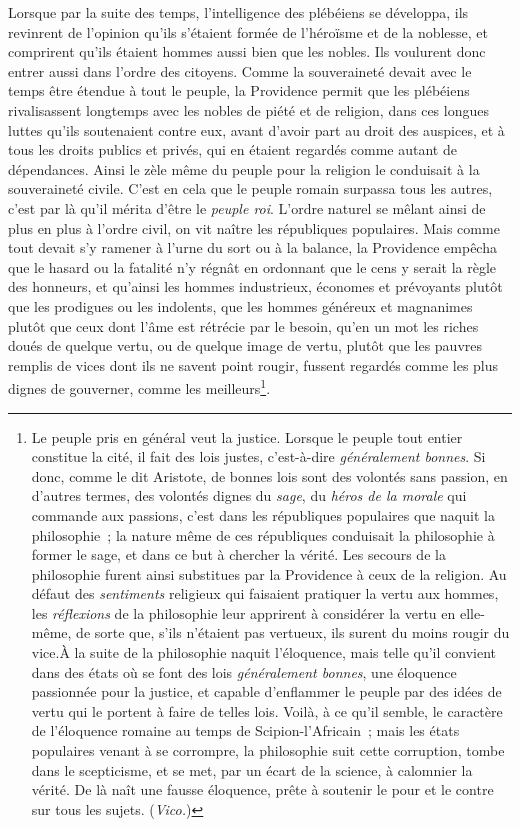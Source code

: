 \documentclass[french,twoside]{book} %
\begin{document}
Lorsque par la suite des temps, l’intelligence des plébéiens se développa, ils revinrent de l’opinion qu’ils s’étaient formée de l’héroïsme et de la noblesse, et comprirent qu’ils étaient hommes aussi bien que les nobles. Ils voulurent donc entrer aussi dans l’ordre des citoyens. Comme la souveraineté devait avec le temps être étendue à tout le peuple, la Providence permit que les plébéiens rivalisassent longtemps avec les nobles de piété et de  religion, dans ces longues luttes qu’ils soutenaient contre eux, avant d’avoir part au droit des auspices, et à tous les droits publics et privés, qui en étaient regardés comme autant de dépendances. Ainsi le zèle même du peuple pour la religion le conduisait à la souveraineté civile. C’est en cela que le peuple romain surpassa tous les autres, c’est par là qu’il mérita d’être le {\itshape peuple roi}. L’ordre naturel se mêlant ainsi de plus en plus à l’ordre civil, on vit naître les républiques populaires. Mais comme tout devait s’y ramener à l’urne du sort ou à la balance, la Providence empêcha que le hasard ou la fatalité n’y régnât en ordonnant que le cens y serait la règle des honneurs, et qu’ainsi les hommes industrieux, économes et prévoyants plutôt que les prodigues ou les indolents, que les hommes généreux et magnanimes plutôt que ceux dont l’âme est rétrécie par le besoin, qu’en un mot les riches doués de quelque vertu, ou de quelque image de vertu, plutôt que les pauvres remplis de vices dont ils ne savent point rougir, fussent regardés comme les plus dignes de gouverner, comme les meilleurs\footnote{Le peuple pris en général veut la justice. Lorsque le peuple tout entier constitue la cité, il fait des lois justes, c’est-à-dire {\itshape généralement bonnes}. Si donc, comme le dit Aristote, de bonnes lois sont des volontés sans passion, en d’autres termes, des volontés dignes du {\itshape sage}, du {\itshape héros de la morale} qui commande aux passions, c’est dans les républiques populaires que naquit la philosophie ; la nature même de ces républiques conduisait la philosophie à former le sage, et dans ce but à chercher la vérité. Les secours de la philosophie furent ainsi substitues par la Providence à ceux de la religion. Au défaut des {\itshape sentiments} religieux qui faisaient pratiquer la vertu aux hommes, les {\itshape réflexions} de la philosophie leur apprirent à considérer la vertu en elle-même, de sorte que, s’ils n’étaient pas vertueux, ils surent du moins rougir du vice.À la suite de la philosophie naquit l’éloquence, mais telle qu’il convient dans des états où se font des lois {\itshape généralement bonnes}, une éloquence passionnée pour la justice, et capable d’enflammer le peuple par des idées de vertu qui le portent à faire de telles lois. Voilà, à ce qu’il semble, le caractère de l’éloquence romaine au temps de Scipion-l’Africain ; mais les états populaires venant à se corrompre, la philosophie suit cette corruption, tombe dans le scepticisme, et se met, par un écart de la science, à calomnier la vérité. De là naît une fausse éloquence, prête à soutenir le pour et le contre sur tous les sujets. ({\itshape Vico.})}.\par
\end{document}
